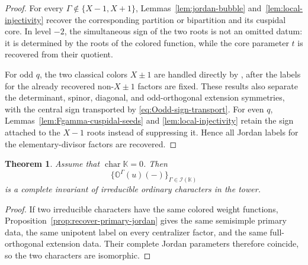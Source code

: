 \documentclass[12pt]{amsart}
\numberwithin{itemcounter}{subsection}
\theoremstyle{plain}
\newtheorem{theorem}{Theorem}[section]
\theoremstyle{definition}
\theoremstyle{remark}
\numberwithin{equation}{section}
\def\bbK{\mathbb{K}}
\def\bbO{\mathbb{O}}
\def\calI{\mathcal{I}}
\begin{document}
\begin{proof}
For every $\Gamma\notin\{X-1,X+1\}$, Lemmas~\ref{lem:jordan-bubble} and~\ref{lem:local-injectivity} recover the corresponding partition or bipartition and its cuspidal core.  In level $-2$, the simultaneous sign of the two roots is not an omitted datum: it is determined by the roots of the colored function, while the core parameter $t$ is recovered from their quotient.

For odd $q$, the two classical colors $X\pm1$ are handled directly by
\cite[Theorem~5.13, Table~4 and Theorem~4.22]{LSZ25}, after the labels for the already recovered non-$X\pm1$ factors are fixed.  These results also separate
the determinant, spinor, diagonal, and odd-orthogonal extension symmetries,
with the central sign transported by \eqref{eq:Oodd-sign-transport}.  For even
$q$, Lemmas~\ref{lem:Fgamma-cuspidal-seeds} and
\ref{lem:local-injectivity} retain the sign attached to the $X-1$ roots instead of suppressing it.  Hence all Jordan labels for the elementary-divisor factors are recovered.
\end{proof}

\begin{theorem}
\label{thm:invariants}
Assume that \(\operatorname{char}\bbK=0\). Then
\[
   \{\bbO^\Gamma(u)(-)\}_{\Gamma\in\calI(\bbK)}
\]
is a complete invariant of irreducible ordinary characters in the tower.
\end{theorem}

\begin{proof}
If two irreducible characters have the same colored weight functions,
Proposition~\ref{prop:recover-primary-jordan} gives the same semisimple
primary data, the same unipotent label on every centralizer factor, and the
same full-orthogonal extension data.  Their complete Jordan parameters
therefore coincide, so the two characters are isomorphic.
\end{proof}
\end{document}
